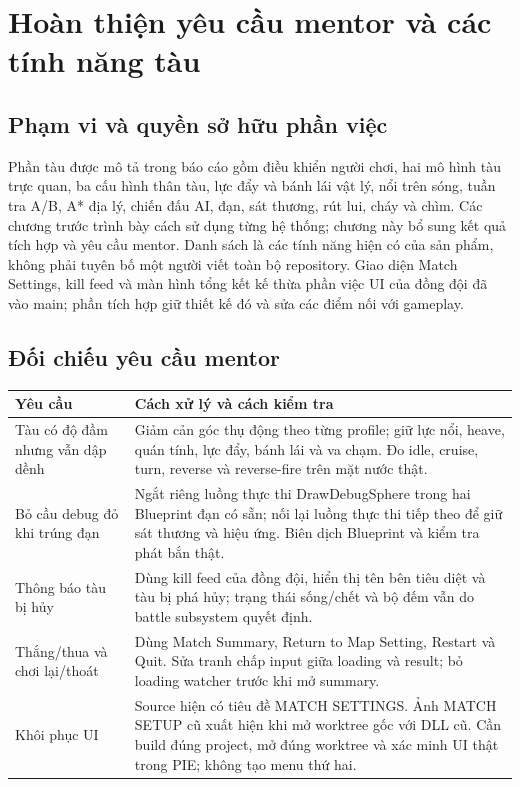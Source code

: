 \chapter{Hoàn thiện yêu cầu mentor và các tính năng tàu}
\label{chap:mentor-final}
\section{Phạm vi và quyền sở hữu phần việc}
Phần tàu được mô tả trong báo cáo gồm điều khiển người chơi, hai mô hình tàu trực quan, ba cấu hình thân tàu, lực đẩy và bánh lái vật lý, nổi trên sóng, tuần tra A/B, A* địa lý, chiến đấu AI, đạn, sát thương, rút lui, cháy và chìm. Các chương trước trình bày cách sử dụng từng hệ thống; chương này bổ sung kết quả tích hợp và yêu cầu mentor. Danh sách là các tính năng hiện có của sản phẩm, không phải tuyên bố một người viết toàn bộ repository. Giao diện Match Settings, kill feed và màn hình tổng kết kế thừa phần việc UI của đồng đội đã vào main; phần tích hợp giữ thiết kế đó và sửa các điểm nối với gameplay.

\section{Đối chiếu yêu cầu mentor}
\begin{longtable}{p{.27\linewidth}p{.65\linewidth}}
\toprule Yêu cầu & Cách xử lý và cách kiểm tra \\ \midrule
Tàu có độ đầm nhưng vẫn dập dềnh & Giảm cản góc thụ động theo từng profile; giữ lực nổi, heave, quán tính, lực đẩy, bánh lái và va chạm. Đo idle, cruise, turn, reverse và reverse-fire trên mặt nước thật. \\
Bỏ cầu debug đỏ khi trúng đạn & Ngắt riêng luồng thực thi DrawDebugSphere trong hai Blueprint đạn có sẵn; nối lại luồng thực thi tiếp theo để giữ sát thương và hiệu ứng. Biên dịch Blueprint và kiểm tra phát bắn thật. \\
Thông báo tàu bị hủy & Dùng kill feed của đồng đội, hiển thị tên bên tiêu diệt và tàu bị phá hủy; trạng thái sống/chết và bộ đếm vẫn do battle subsystem quyết định. \\
Thắng/thua và chơi lại/thoát & Dùng Match Summary, Return to Map Setting, Restart và Quit. Sửa tranh chấp input giữa loading và result; bỏ loading watcher trước khi mở summary. \\
Khôi phục UI & Source hiện có tiêu đề MATCH SETTINGS. Ảnh MATCH SETUP cũ xuất hiện khi mở worktree gốc với DLL cũ. Cần build đúng project, mở đúng worktree và xác minh UI thật trong PIE; không tạo menu thứ hai. \\
\bottomrule
\end{longtable}

